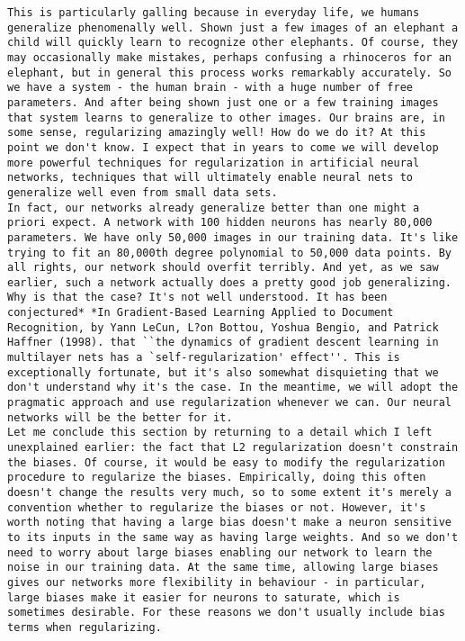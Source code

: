 \begin{lstlisting}
This is particularly galling because in everyday life, we humans generalize phenomenally well. Shown just a few images of an elephant a child will quickly learn to recognize other elephants. Of course, they may occasionally make mistakes, perhaps confusing a rhinoceros for an elephant, but in general this process works remarkably accurately. So we have a system - the human brain - with a huge number of free parameters. And after being shown just one or a few training images that system learns to generalize to other images. Our brains are, in some sense, regularizing amazingly well! How do we do it? At this point we don't know. I expect that in years to come we will develop more powerful techniques for regularization in artificial neural networks, techniques that will ultimately enable neural nets to generalize well even from small data sets.
In fact, our networks already generalize better than one might a priori expect. A network with 100 hidden neurons has nearly 80,000 parameters. We have only 50,000 images in our training data. It's like trying to fit an 80,000th degree polynomial to 50,000 data points. By all rights, our network should overfit terribly. And yet, as we saw earlier, such a network actually does a pretty good job generalizing. Why is that the case? It's not well understood. It has been conjectured* *In Gradient-Based Learning Applied to Document Recognition, by Yann LeCun, L?on Bottou, Yoshua Bengio, and Patrick Haffner (1998). that ``the dynamics of gradient descent learning in multilayer nets has a `self-regularization' effect''. This is exceptionally fortunate, but it's also somewhat disquieting that we don't understand why it's the case. In the meantime, we will adopt the pragmatic approach and use regularization whenever we can. Our neural networks will be the better for it.
Let me conclude this section by returning to a detail which I left unexplained earlier: the fact that L2 regularization doesn't constrain the biases. Of course, it would be easy to modify the regularization procedure to regularize the biases. Empirically, doing this often doesn't change the results very much, so to some extent it's merely a convention whether to regularize the biases or not. However, it's worth noting that having a large bias doesn't make a neuron sensitive to its inputs in the same way as having large weights. And so we don't need to worry about large biases enabling our network to learn the noise in our training data. At the same time, allowing large biases gives our networks more flexibility in behaviour - in particular, large biases make it easier for neurons to saturate, which is sometimes desirable. For these reasons we don't usually include bias terms when regularizing.

\end{lstlisting}
